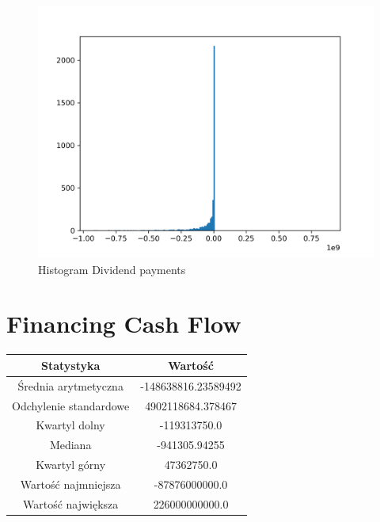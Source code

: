 \documentclass{article}
\begin{document}
\begin{figure}[h!]
    \includegraphics[width=\linewidth]{variables/Dividend payments.png}
    \caption{Histogram Dividend payments }
\end{figure}\section{ Financing Cash Flow }

\begin{center}
    \begin{tabular}{|c | c|} 
    \hline
    Statystyka & Wartość \\
    \hline\hline
    Średnia arytmetyczna & -148638816.23589492 \\ 
    \hline
    Odchylenie standardowe & 4902118684.378467 \\
    \hline
    Kwartyl dolny & -119313750.0 \\
    \hline
    Mediana & -941305.94255 \\
    \hline
    Kwartyl górny & 47362750.0 \\
    \hline
    Wartość najmniejsza & -87876000000.0 \\
    \hline
    Wartość największa & 226000000000.0 \\
    \hline
   \end{tabular}
\end{center}
\end{document}
